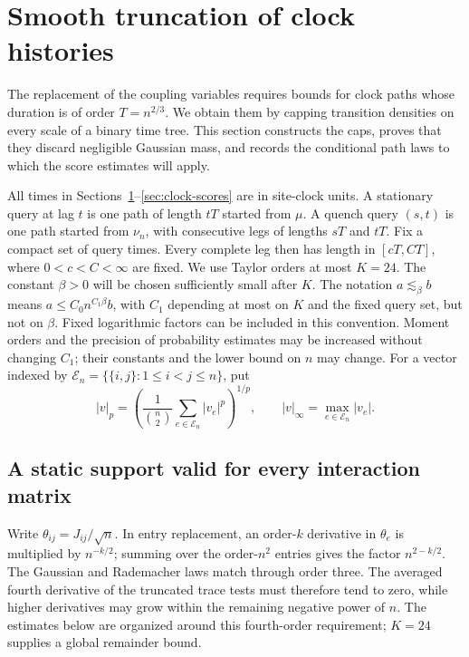 \section{Smooth truncation of clock histories}\label{sec:history-cutoffs}

The replacement of the coupling variables requires bounds for clock paths
whose duration is of order $T=n^{2/3}$.  We obtain them by capping transition
densities on every scale of a binary time tree.  This section constructs the
caps, proves that they discard negligible Gaussian mass, and records the
conditional path laws to which the score estimates will apply.

All times in Sections~\ref{sec:history-cutoffs}--\ref{sec:clock-scores} are
in site-clock units.  A stationary query at lag $t$ is one path of length
$tT$ started from $\mu$.  A quench query $(s,t)$ is one path started from
$\nu_n$, with consecutive legs of lengths $sT$ and $tT$.  Fix a compact set
of query times.  Every complete leg then has length in $[cT,CT]$, where
$0<c<C<\infty$ are fixed.  We use Taylor orders at most
$K=24$.  The constant $\beta>0$ will be chosen sufficiently small after
$K$.  The notation $a\lesssim_\beta b$ means
$a\le C_0 n^{C_1\beta}b$, with $C_1$ depending at most on $K$ and the fixed
query set, but not on $\beta$.  Fixed logarithmic factors can be included in
this convention.  Moment orders and the precision of probability estimates
may be increased without changing $C_1$; their constants and the lower bound
on $n$ may change.  For a vector indexed by
$\mathscr E_n=\{\{i,j\}:1\le i<j\le n\}$, put
\[
 |v|_p=\left(\frac1{\binom n2}\sum_{e\in\mathscr E_n}|v_e|^p\right)^{1/p},
 \qquad |v|_\infty=\max_{e\in\mathscr E_n}|v_e|.
\]

\subsection{A static support valid for every interaction matrix}

Write $\theta_{ij}=J_{ij}/\sqrt n$.  In entry replacement, an order-$k$
derivative in $\theta_e$ is multiplied by $n^{-k/2}$; summing over the
order-$n^2$ entries gives the factor $n^{2-k/2}$.  The Gaussian and
Rademacher laws match through order three.  The averaged fourth derivative
of the truncated trace tests must therefore tend to zero, while higher
derivatives may grow within the remaining negative power of $n$.  The
estimates below are organized around this fourth-order requirement;
$K=24$ supplies a global remainder bound.

